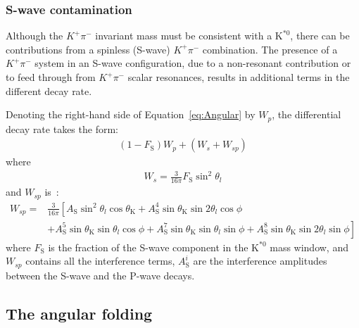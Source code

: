 \subsubsection{S-wave contamination}
\label{sec:S-waveform}

Although the $K^+\pi^-$ invariant mass must be consistent with a $\text{K}^{*0}$, there can be contributions from a spinless (S-wave) $K^+\pi^-$ combination.
The presence of a $K^+\pi^-$ system in an S-wave configuration, due to a non-resonant contribution or to feed through from $K^+\pi^-$ scalar resonances, results in additional terms in the different decay rate.

Denoting the right-hand side of Equation~\ref{eq:Angular} by $W_p$, the differential decay rate takes the form:
\begin{equation} \label{eq:S-wave}
  \begin{split}
    (1-F_\mathrm{S})W_p + (W_s + W_{sp})
  \end{split}
\end{equation}
where 
\begin{equation} \label{eq:S-wave0}
  \begin{split}
    W_s = \frac{3}{16\pi} F_\mathrm{S}\sin^2\theta_l
  \end{split}
\end{equation}
and $W_{sp}$ is~\cite{Genon:Swave}:
\begin{equation} \label{eq:S-wave1}
  \begin{split}
    W_{sp}= &\frac{3}{16 \pi}\left[ A_\mathrm{S}\sin^2\theta_l\cos\theta_\mathrm{K}+ A_\mathrm{S}^4\sin\theta_\mathrm{K}\sin2\theta_l\cos\phi\right.\\
      &+\left.A^5_\mathrm{S}\sin\theta_\mathrm{K}\sin\theta_l\cos\phi+A_\mathrm{S}^7\sin\theta_\mathrm{K}\sin\theta_l\sin\phi+A_\mathrm{S}^8\sin\theta_\mathrm{K}\sin2\theta_l\sin\phi\right]
  \end{split}
\end{equation}
where $F_\mathrm{S}$ is the fraction of the S-wave component in the $\text{K}^{*0}$ mass window, and $W_{sp}$ contains all the interference terms, $A_\mathrm{S}^i$ are the interference amplitudes between the S-wave and the P-wave decays\cite{Genon:Swave}.

\subsection{The angular folding}
\label{sec:folding}

